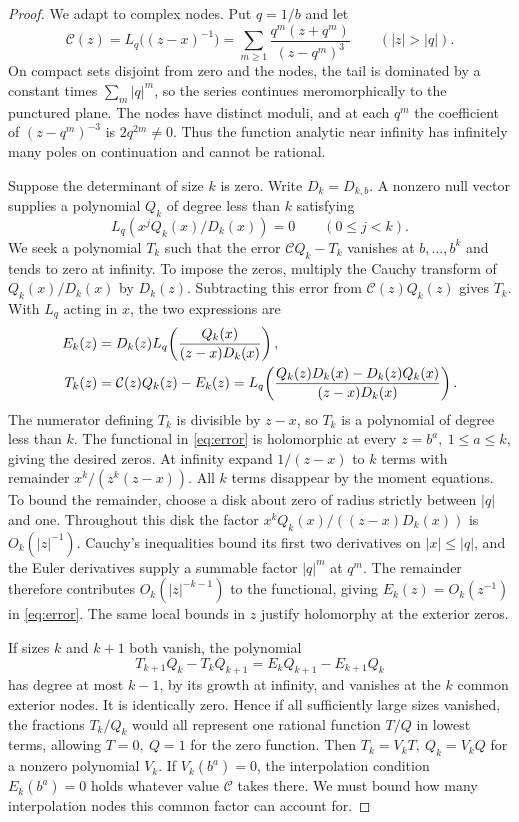 \documentclass[11pt,letterpaper]{article}
\numberwithin{equation}{section}
\begin{document}
\begin{proof}
We adapt \cite[Proposition~5.1]{Uplift} to complex nodes. Put
\(q=1/b\) and let
\[
 \mathcal C(z)=L_q\big((z-x)^{-1}\big)
       =\sum_{m\ge1}\frac{q^m(z+q^m)}{(z-q^m)^3}
                  \qquad(|z|>|q|).
\]
On compact sets disjoint from zero and the nodes, the tail is
dominated by a constant times \(\sum_m|q|^m\), so the series
continues meromorphically to the punctured plane. The nodes have
distinct moduli, and at each \(q^m\) the coefficient of
\((z-q^m)^{-3}\) is \(2q^{2m}\ne0\). Thus the function analytic
near infinity has infinitely many poles on continuation and cannot
be rational.

Suppose the determinant of size \(k\) is zero. Write \(D_k=D_{k,b}\).
A nonzero null vector supplies a polynomial \(Q_k\) of degree
less than \(k\) satisfying
\[
           L_q(x^jQ_k(x)/D_k(x))=0\qquad(0\le j<k).
\]
We seek a polynomial \(T_k\) such that the error
\(\mathcal C Q_k-T_k\) vanishes at \(b,\ldots,b^k\) and tends to
zero at infinity. To impose the zeros, multiply the Cauchy transform
of \(Q_k(x)/D_k(x)\) by \(D_k(z)\). Subtracting this error from
\(\mathcal C(z)Q_k(z)\) gives \(T_k\). With \(L_q\) acting in \(x\),
the two expressions are
\begin{align}
 E_k(z)&=D_k(z)L_q\!\left(\frac{Q_k(x)}{(z-x)D_k(x)}\right),
                                                     \label{eq:error}\\
 T_k(z)&=\mathcal C(z)Q_k(z)-E_k(z)
       =L_q\!\left(\frac{Q_k(z)D_k(x)-D_k(z)Q_k(x)}
                               {(z-x)D_k(x)}\right).\notag
\end{align}
The numerator defining \(T_k\) is divisible by \(z-x\), so \(T_k\)
is a polynomial of degree less than \(k\). The functional in
\eqref{eq:error} is holomorphic at every \(z=b^a,\ 1\le a\le k\),
giving the desired zeros. At infinity expand \(1/(z-x)\) to \(k\)
terms with remainder
\(x^k/(z^k(z-x))\). All \(k\) terms disappear by the moment
equations. To bound the remainder, choose a disk about zero of
radius strictly between \(|q|\) and one. Throughout this disk
the factor \(x^k Q_k(x)/((z-x)D_k(x))\) is \(O_k(|z|^{-1})\).
Cauchy's inequalities bound its first two derivatives on
\(|x|\le |q|\), and the Euler derivatives supply a summable factor
\(|q|^m\) at \(q^m\). The remainder therefore contributes
\(O_k(|z|^{-k-1})\) to the functional, giving \(E_k(z)=O_k(z^{-1})\)
in \eqref{eq:error}. The same local bounds in \(z\) justify
holomorphy at the exterior zeros.

If sizes \(k\) and \(k+1\) both vanish, the polynomial
\[
      T_{k+1}Q_k-T_kQ_{k+1}=E_kQ_{k+1}-E_{k+1}Q_k
\]
has degree at most \(k-1\), by its growth at infinity, and vanishes
at the \(k\) common exterior nodes. It is identically zero.
Hence if all sufficiently large sizes vanished, the fractions
\(T_k/Q_k\) would all represent one rational function \(T/Q\)
in lowest terms, allowing \(T=0,\ Q=1\) for the zero function.
Then \(T_k=V_kT,\ Q_k=V_kQ\) for a nonzero polynomial \(V_k\).
If \(V_k(b^a)=0\), the interpolation condition \(E_k(b^a)=0\) holds
whatever value \(\mathcal C\) takes there. We must bound how many
interpolation nodes this common factor can account for.


\end{proof}
\end{document}
